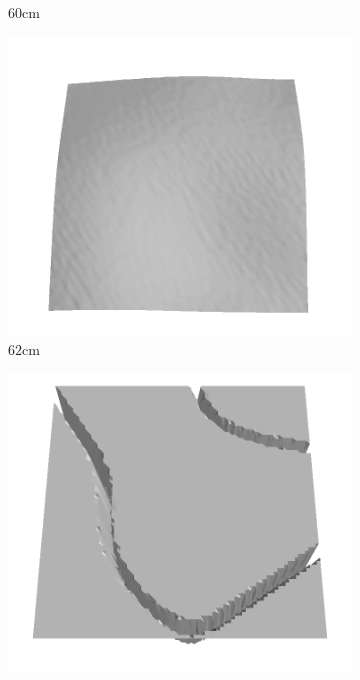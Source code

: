 \documentclass[../document.tex]{subfiles}
\begin{document}
\begin{figure}[htbp]
\begin{subfigure}[b]{0.19\textwidth}
    \caption{$60$cm}
    \end{subfigure}
    \begin{subfigure}[b]{0.19\textwidth}
    \includegraphics[width=\linewidth]{../img/5/train/all/62-patch-3d-majavi-32.png}
    \caption{$62$cm}
    \end{subfigure}
    \begin{subfigure}[b]{0.19\textwidth}
    \includegraphics[width=\linewidth]{../img/5/train/all/63-patch-3d-majavi-33.png}

\end{subfigure}
\end{figure}
\end{document}
